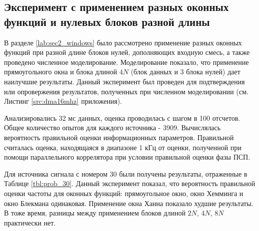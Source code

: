 {\begin{tabular}{ | c | c | c | c |}
	\end{tabular}%
} 

\subsection{Эксперимент с применением разных оконных функций и нулевых блоков разной длины }

В разделе \ref{lab:sec2_windows} было рассмотрено применение разных оконных функций при разной длине блоков нулей, дополняющих входную смесь, а также проведено численное моделирование.
Моделирование показало, что применение прямоугольного окна и блока длиной ${4N}$ (блок данных и 3 блока нулей) дает наилучшие результаты. Данный эксперимент был проведен для
подтверждения или опровержения результатов, полученных при численном моделировании (см. Листинг \ref{src:dma16mhz} приложения).

Анализировались 32 мс данных, оценка проводилась с шагом в 100 отсчетов. Общее количество опытов для каждого источника - 3909. Вычислялась вероятность правильной оценки информационных параметров.
Правильной считалась оценка, находящаяся в диапазоне 1 кГц от оценки, полученной при помощи параллельного коррелятора при условии правильной оценки фазы ПСП.

Для источника сигнала с номером 30 были получены результаты, отраженные в Таблице \ref{tbl:prob_30}. Данный эксперимент показал, что вероятность правильной оценки частоты для
оконных функций: прямоугольное окно, окно Хемминга и окно Блекмана одинаковая. Применение окна Ханна показало худшие результаты. В тоже время, разницы между применением блоков длиной ${2N}$,
${4N}$, ${8N}$ практически нет.

